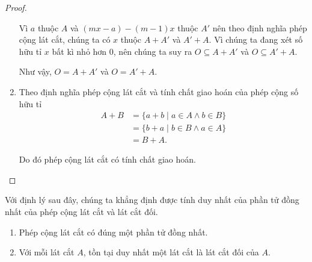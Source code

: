 \begin{proof}
\begin{enumerate}[label={(\roman*)}]
              Vì $a$ thuộc $A$ và $(mx - a) - (m-1)x$ thuộc $A'$ nên theo định nghĩa phép cộng lát cắt, chúng ta có $x$ thuộc $A + A'$ và $A' + A$. Vì chúng ta đang xét số hữu tỉ $x$ bất kì nhỏ hơn $0$, nên chúng ta suy ra $O \subseteq A + A'$ và $O \subseteq A' + A$.

              Như vậy, $O = A + A'$ và $O = A' + A$.
        \item Theo định nghĩa phép cộng lát cắt và tính chất giao hoán của phép cộng số hữu tỉ
              \begin{align*}
                  A + B & = \{ a + b \mid a\in A \wedge b\in B \} \\
                        & = \{ b + a \mid b\in B \wedge a\in A \} \\
                        & = B + A.
              \end{align*}

              Do đó phép cộng lát cắt có tính chất giao hoán.
    \end{enumerate}
\end{proof}

Với định lý sau đây, chúng ta khẳng định được tính duy nhất của phần tử đồng nhất của phép cộng lát cắt và lát cắt đối.
\begin{theorem}
    \begin{enumerate}[label={(\roman*)}]
        \item Phép cộng lát cắt có đúng một phần tử đồng nhất.
        \item Với mỗi lát cắt $A$, tồn tại duy nhất một lát cắt là lát cắt đối của $A$.
    \end{enumerate}
\end{theorem}

